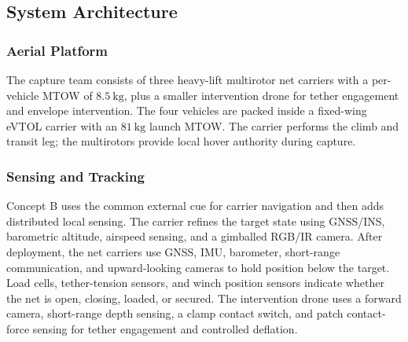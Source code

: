 \subsection{System Architecture}
\label{subsec:concept_B_architecture}

\subsubsection{Aerial Platform}
The capture team consists of three heavy-lift multirotor net carriers
with a per-vehicle MTOW of \(8.5~\mathrm{kg}\), plus a smaller
intervention drone for tether engagement and envelope intervention. The
four vehicles are packed inside a fixed-wing eVTOL carrier with an
\(81~\mathrm{kg}\) launch MTOW. The carrier performs the climb and
transit leg; the multirotors provide local hover authority during
capture.


\subsubsection{Sensing and Tracking}
\label{subsubsec:conceptB_sensing_tracking}

Concept B uses the common external cue for carrier navigation and then
adds distributed local sensing. The carrier refines the target state
using GNSS/INS, barometric altitude, airspeed sensing, and a gimballed
RGB/IR camera. After deployment, the net carriers use GNSS, IMU,
barometer, short-range communication, and upward-looking cameras to hold
position below the target. Load cells, tether-tension sensors, and winch
position sensors indicate whether the net is open, closing, loaded, or
secured. The intervention drone uses a forward camera, short-range depth
sensing, a clamp contact switch, and patch contact-force sensing for
tether engagement and controlled deflation.

